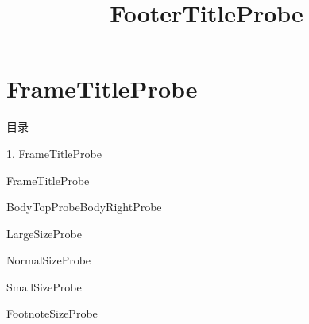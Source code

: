 \documentclass[aspectratio=169,10pt,fontset=fandol]{ctexbeamer}
\title{FooterTitleProbe}
\begin{document}
\section{FrameTitleProbe}
\begin{frame}[t,fragile]{目录}
\normalsize
{\color{blue}\normalsize 1. FrameTitleProbe\par}\vspace{0.3em}
\end{frame}
\begin{frame}[t,fragile]{FrameTitleProbe}
\normalsize
{\normalsize
\noindent BodyTopProbe\hfill BodyRightProbe\par
{\large LargeSizeProbe}\par
{\normalsize NormalSizeProbe}\par
{\small SmallSizeProbe}\par
{\footnotesize FootnoteSizeProbe}\par

}
\end{frame}
\end{document}
